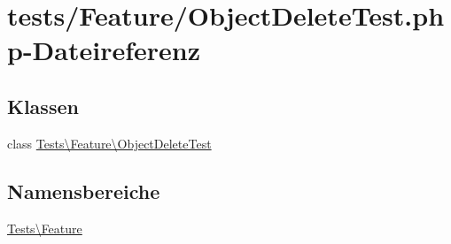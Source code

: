 \hypertarget{ObjectDeleteTest_8php}{}\section{tests/\+Feature/\+Object\+Delete\+Test.php-\/\+Dateireferenz}
\label{ObjectDeleteTest_8php}
\subsection*{Klassen}
\begin{DoxyCompactItemize}
\item 
class \hyperlink{classTests_1_1Feature_1_1ObjectDeleteTest}{Tests\textbackslash{}\+Feature\textbackslash{}\+Object\+Delete\+Test}
\end{DoxyCompactItemize}
\subsection*{Namensbereiche}
\begin{DoxyCompactItemize}
\item 
 \hyperlink{namespaceTests_1_1Feature}{Tests\textbackslash{}\+Feature}
\end{DoxyCompactItemize}
